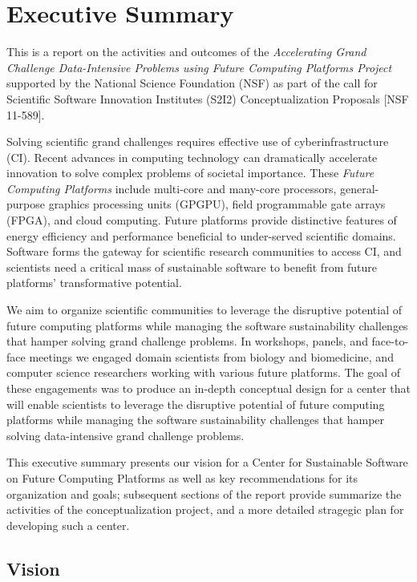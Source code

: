 \section{Executive Summary}
 This is a report on the activities and outcomes of the 
\textit{Accelerating Grand Challenge Data-Intensive 
Problems using Future Computing Platforms Project}
supported by the National Science Foundation (NSF) 
as part of the call for Scientific Software Innovation Institutes (S2I2) 
Conceptualization Proposals [NSF 11-589]. 

Solving scientific grand challenges requires effective use of cyberinfrastructure (CI).
Recent advances in computing technology can dramatically accelerate innovation 
to solve complex problems of societal importance. 
These \textit{Future Computing Platforms} include 
multi-core and many-core processors,
general-purpose graphics processing units (GPGPU),
field programmable gate arrays (FPGA), and
cloud computing. 
Future platforms provide distinctive features
of energy efficiency and performance beneficial 
to under-served scientific domains. 
Software forms the gateway for scientific research communities to access CI, 
and scientists need a critical mass of
sustainable software to benefit from future platforms' transformative potential.


We aim to organize scientific communities to leverage the disruptive potential of future
computing platforms while managing the software sustainability challenges that hamper solving
grand challenge problems.
In workshops, panels, and face-to-face meetings we engaged
domain scientists from biology and biomedicine, 
and 
computer science researchers working with various future platforms.
The goal of these engagements 
was to produce an in-depth conceptual design for a center that will enable scientists to leverage the disruptive potential of future computing platforms while managing the software sustainability challenges that hamper solving data-intensive grand challenge problems.


This executive summary presents our vision for a Center for Sustainable Software on Future Computing Platforms as well as key recommendations for its organization and goals;
 subsequent sections of the report provide  summarize the activities of the conceptualization project, and a more detailed stragegic plan for developing such a center.

\subsection{Vision}

